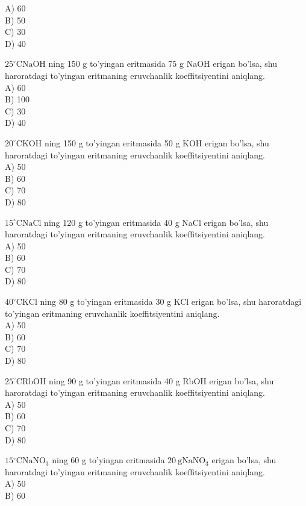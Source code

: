 A) 60\\
B) 50\\
C) 30\\
D) 40
  \item $25^{\circ} \mathrm{C} \mathrm{NaOH}$ ning 150 g to'yingan eritmasida 75 g NaOH erigan bo'lsa, shu haroratdagi to'yingan eritmaning eruvchanlik koeffitsiyentini aniqlang.\\
A) 60\\
B) 100\\
C) 30\\
D) 40
  \item $20^{\circ} \mathrm{C} \mathrm{KOH}$ ning 150 g to'yingan eritmasida 50 g KOH erigan bo'lsa, shu\\
haroratdagi to'yingan eritmaning eruvchanlik koeffitsiyentini aniqlang.\\
A) 50\\
B) 60\\
C) 70\\
D) 80
  \item $15^{\circ} \mathrm{C} \mathrm{NaCl}$ ning 120 g to'yingan eritmasida 40 g NaCl erigan bo'lsa, shu haroratdagi to'yingan eritmaning eruvchanlik koeffitsiyentini aniqlang.\\
A) 50\\
B) 60\\
C) 70\\
D) 80
  \item $40^{\circ} \mathrm{C} \mathrm{KCl}$ ning 80 g to'yingan eritmasida 30 g KCl erigan bo'lsa, shu haroratdagi to'yingan eritmaning eruvchanlik koeffitsiyentini aniqlang.\\
A) 50\\
B) 60\\
C) 70\\
D) 80
  \item $25^{\circ} \mathrm{C} \mathrm{RbOH}$ ning 90 g to'yingan eritmasida 40 g RbOH erigan bo'lsa, shu haroratdagi to'yingan eritmaning eruvchanlik koeffitsiyentini aniqlang.\\
A) 50\\
B) 60\\
C) 70\\
D) 80
  \item $15{ }^{\circ} \mathrm{C} \mathrm{NaNO}_{3}$ ning 60 g to'yingan eritmasida $20 \mathrm{~g} \mathrm{NaNO}_{3}$ erigan bo'lsa, shu haroratdagi to'yingan eritmaning eruvchanlik koeffitsiyentini aniqlang.\\
A) 50\\
B) 60\\
